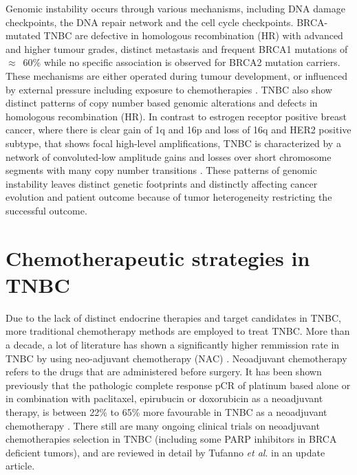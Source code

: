 Genomic instability occurs through various mechanisms, including DNA damage checkpoints, the DNA repair network and the cell cycle checkpoints. BRCA-mutated TNBC are defective in homologous recombination (HR) with advanced and higher tumour grades, distinct metastasis and frequent BRCA1 mutations of $\approx$~60\% while no specific association is observed for BRCA2 mutation carriers\cite{boyle2012triple, atchley2008clinical}. These mechanisms are either operated during tumour development, or influenced by external pressure including exposure to chemotherapies \cite{burrell2013causes,ding2012clonal,hunter2006hypermutation}.
TNBC also show distinct patterns of copy number based genomic alterations and defects in homologous recombination (HR). In contrast to estrogen receptor positive breast cancer, where there is clear gain of 1q and 16p and loss of 16q and HER2 positive subtype, that shows focal high-level amplifications, TNBC is characterized by a network of convoluted-low amplitude gains and losses over short chromosome segments with many copy number transitions \cite{kwei2010genomic}. These patterns of genomic instability leaves distinct genetic footprints and distinctly affecting cancer evolution and patient outcome because of tumor heterogeneity restricting the successful outcome. 


\section{Chemotherapeutic strategies in TNBC}
Due to the lack of distinct endocrine therapies and target candidates in TNBC, more traditional chemotherapy methods are employed to treat TNBC. More than a decade, a lot of literature has shown a significantly higher remmission rate in TNBC by using neo-adjuvant chemotherapy (NAC) \cite{liedtke2008response,symmans2017long}. Neoadjuvant chemotherapy refers to the drugs that are administered before surgery. It has been shown previously that the pathologic complete response \ac{pCR} of platinum based alone or in combination with paclitaxel, epirubucin or doxorubicin as a neoadjuvant therapy, is between 22\% to 65\% 
more favourable in TNBC as a neoadjuvant chemotherapy \cite{silver2010efficacy,petrelli2014value,garber2006neo,frasci2009preoperative}. There still are many ongoing clinical trials on neoadjuvant chemotherapies selection in TNBC (including some PARP inhibitors in BRCA deficient tumors), and are reviewed in detail by Tufanno \textit{et al}. \cite{tufano2020updates} in an update article.

